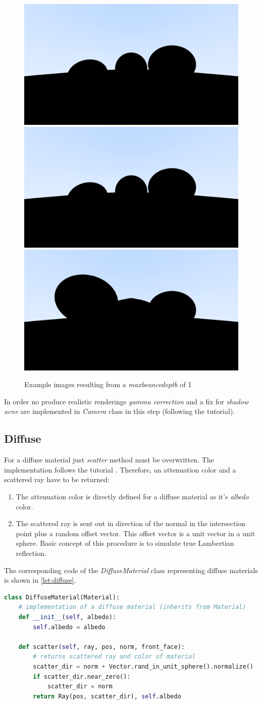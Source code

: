 \documentclass[]{article}
\begin{document}
		\begin{figure}[h]
			\centering
			\includegraphics[width=0.3\linewidth]{image5}
			\includegraphics[width=0.3\linewidth]{image6}
			\includegraphics[width=0.3\linewidth]{image7}
			\caption{Example images resulting from a \emph{max\textunderscore bounce\textunderscore depth} of 1}
			\label{fig:image567-black}
		\end{figure}
	
		In order no produce realistic renderings \emph{gamma correction} and a fix for \emph{shadow acne} are implemented in \emph{Camera} class in this step (following the tutorial).	
		
		\subsection{Diffuse}
		For a diffuse material just \emph{scatter} method must be overwritten. The implementation follows the tutorial \cite{Shirley2020RTW1}. Therefore, an attenuation color and a scattered ray have to be returned:
		\begin{enumerate}
			\item{The attenuation color is directly defined for a diffuse material as it’s \emph{albedo} color.}
			\item{The scattered ray is sent out in direction of the normal in the intersection point plus a random offset vector. This offset vector is a unit vector in a unit sphere. Basic concept of this procedure is to simulate true Lambertian reflection.}
		\end{enumerate}
	
		The corresponding code of the \emph{DiffuseMaterial} class representing diffuse materials is shown in \cref{lst:diffuse}.
		\begin{lstlisting}[caption={\emph{DiffuseMaterial} class}, language=Python, label=lst:diffuse]
class DiffuseMaterial(Material):
	# implementation of a diffuse material (inherits from Material)
	def __init__(self, albedo):
		self.albedo = albedo
	
	def scatter(self, ray, pos, norm, front_face):
		# returns scattered ray and color of material
		scatter_dir = norm + Vector.rand_in_unit_sphere().normalize()
		if scatter_dir.near_zero():
			scatter_dir = norm
		return Ray(pos, scatter_dir), self.albedo
		\end{lstlisting}
		
\end{document}
